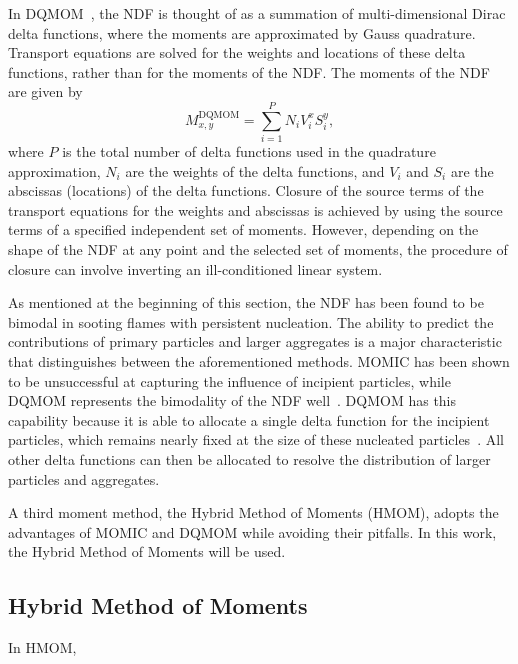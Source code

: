 In DQMOM~\cite{marchisio2005}, the NDF is thought of as a summation of multi-dimensional Dirac delta functions, where the moments are approximated by Gauss quadrature. Transport equations are solved for the weights and locations of these delta functions, rather than for the moments of the NDF. The moments of the NDF are given by
\begin{equation}\label{eq:lesmodels:soot:ndf:dqmom}
  M_{x,y}^{\text{DQMOM}} = \sum\limits_{i=1}^{P} N_i V_i^x S_i^y,
\end{equation}
where $P$ is the total number of delta functions used in the quadrature approximation, $N_i$ are the weights of the delta functions, and $V_i$ and $S_i$ are the abscissas (locations) of the delta functions. Closure of the source terms of the transport equations for the weights and abscissas is achieved by using the source terms of a specified independent set of moments. However, depending on the shape of the NDF at any point and the selected set of moments, the procedure of closure can involve inverting an ill-conditioned linear system.

As mentioned at the beginning of this section, the NDF has been found to be bimodal in sooting flames with persistent nucleation. The ability to predict the contributions of primary particles and larger aggregates is a major characteristic that distinguishes between the aforementioned methods. MOMIC has been shown to be unsuccessful at capturing the influence of incipient particles, while DQMOM represents the bimodality of the NDF well~\cite{mueller2009}. DQMOM has this capability because it is able to allocate a single delta function for the incipient particles, which remains nearly fixed at the size of these nucleated particles~\cite{blanquart2009}. All other delta functions can then be allocated to resolve the distribution of larger particles and aggregates.

A third moment method, the Hybrid Method of Moments (HMOM), adopts the advantages of MOMIC and DQMOM while avoiding their pitfalls. In this work, the Hybrid Method of Moments will be used.

\subsection{Hybrid Method of Moments}
\label{sec:lesmodels:soot:hmom}

In HMOM, 
